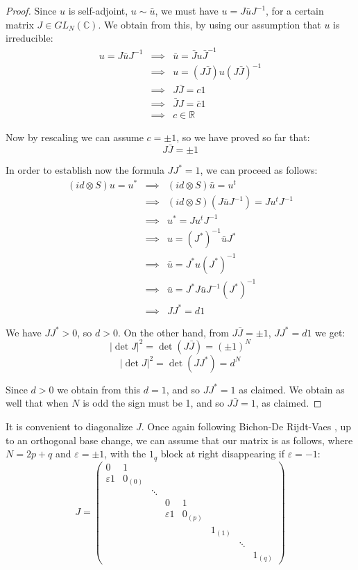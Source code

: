 \documentclass[12pt]{amsbook}
\begin{document}
\begin{proof}
Since $u$ is self-adjoint, $u\sim\bar{u}$, we must have $u=J\bar{u}J^{-1}$, for a certain matrix $J\in GL_N(\mathbb C)$. We obtain from this, by using our assumption that $u$ is irreducible:
\begin{eqnarray*}
u=J\bar{u}J^{-1}
&\implies&\bar{u}=\bar{J}u\bar{J}^{-1}\\
&\implies&u=(J\bar{J})u(J\bar{J})^{-1}\\
&\implies&J\bar{J}=c1\\
&\implies&\bar{J}J=\bar{c}1\\
&\implies&c\in\mathbb R
\end{eqnarray*}

Now by rescaling we can assume $c=\pm1$, so we have proved so far that:
$$J\bar{J}=\pm 1$$

In order to establish now the formula $JJ^*=1$, we can proceed as follows:
\begin{eqnarray*}
(id\otimes S)u=u^*
&\implies&(id\otimes S)\bar{u}=u^t\\
&\implies&(id\otimes S)(J\bar{u}J^{-1})=Ju^tJ^{-1}\\
&\implies&u^*=Ju^tJ^{-1}\\
&\implies&u=(J^*)^{-1}\bar{u}J^*\\
&\implies&\bar{u}=J^*u(J^*)^{-1}\\
&\implies&\bar{u}=J^*J\bar{u}J^{-1}(J^*)^{-1}\\
&\implies&JJ^*=d1
\end{eqnarray*}

We have $JJ^*>0$, so $d>0$. On the other hand, from $J\bar{J}=\pm 1$, $JJ^*=d1$ we get:
$$|\det J|^2=\det(J\bar{J})=(\pm1)^N$$
$$|\det J|^2=\det(JJ^*)=d^N$$

Since $d>0$ we obtain from this $d=1$, and so $JJ^*=1$ as claimed. We obtain as well that when $N$ is odd the sign must be 1, and so $J\bar{J}=1$, as claimed.
\end{proof}

It is convenient to diagonalize $J$. Once again following Bichon-De Rijdt-Vaes \cite{bdv}, up to an orthogonal base change, we can assume that our matrix is as follows, where $N=2p+q$ and $\varepsilon=\pm 1$, with the $1_q$ block at right disappearing if $\varepsilon=-1$:
$$J=\begin{pmatrix}
0&1\ \ \ \\
\varepsilon 1&0_{(0)}\\
&&\ddots\\
&&&0&1\ \ \ \\
&&&\varepsilon 1&0_{(p)}\\
&&&&&1_{(1)}\\
&&&&&&\ddots\\
&&&&&&&1_{(q)}
\end{pmatrix}$$
\end{document}

